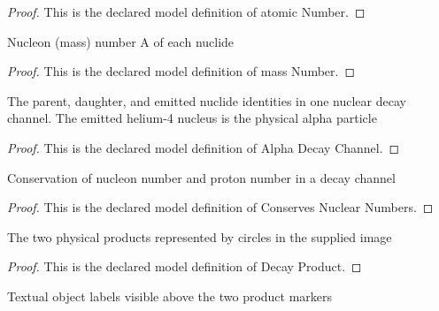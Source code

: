 \begin{proof}
  This is the declared model definition of atomic Number.
\end{proof}
\begin{definition}
  \label{def:physics:phyx-mini-0618:phyxminiproblems-problemphyxmini0618-nuclide-massnumber}
  Nucleon (mass) number A of each nuclide
\end{definition}
\begin{proof}
  This is the declared model definition of mass Number.
\end{proof}
\begin{definition}
  \label{def:physics:phyx-mini-0618:phyxminiproblems-problemphyxmini0618-alphadecaychannel}
  The parent, daughter, and emitted nuclide identities in one nuclear decay channel. The emitted helium-4 nucleus is the physical alpha particle
\end{definition}
\begin{proof}
  This is the declared model definition of Alpha Decay Channel.
\end{proof}
\begin{definition}
  \label{def:physics:phyx-mini-0618:phyxminiproblems-problemphyxmini0618-conservesnuclearnumbers}
  Conservation of nucleon number and proton number in a decay channel
\end{definition}
\begin{proof}
  This is the declared model definition of Conserves Nuclear Numbers.
\end{proof}
\begin{definition}
  \label{def:physics:phyx-mini-0618:phyxminiproblems-problemphyxmini0618-decayproduct}
  The two physical products represented by circles in the supplied image
\end{definition}
\begin{proof}
  This is the declared model definition of Decay Product.
\end{proof}
\begin{definition}
  \label{def:physics:phyx-mini-0618:phyxminiproblems-problemphyxmini0618-productfigurelabel}
  Textual object labels visible above the two product markers
\end{definition}

